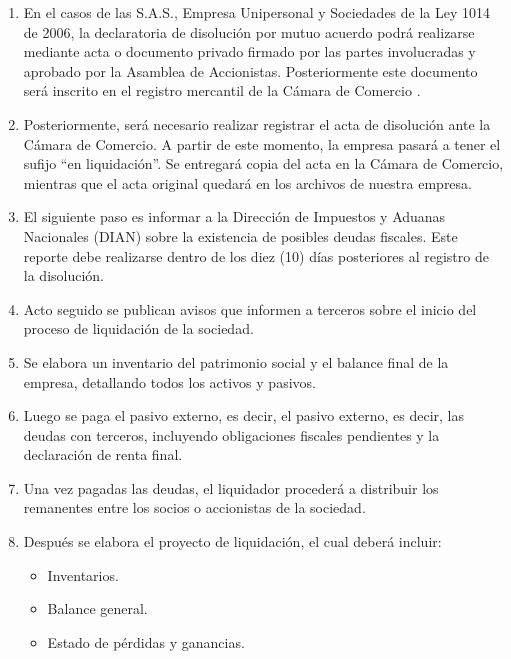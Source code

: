 \begin{enumerate}
	\item En el casos de las S.A.S., Empresa Unipersonal y Sociedades de la Ley 1014 de 2006, la declaratoria de disolución por mutuo acuerdo podrá realizarse mediante acta o documento privado firmado por las partes involucradas y aprobado por la Asamblea de Accionistas. Posteriormente este documento será inscrito en el registro mercantil de la Cámara de Comercio \parencite{Ley1014}.
	
	\item Posteriormente, será necesario realizar registrar el acta de disolución ante la Cámara de Comercio. A partir de este momento, la empresa pasará a tener el sufijo ``en liquidación''. Se entregará copia del acta en la Cámara de Comercio, mientras que el acta original quedará en los archivos de nuestra empresa.
	
	\item El siguiente paso es informar a la Dirección de Impuestos y Aduanas Nacionales (DIAN) sobre la existencia de posibles deudas fiscales. Este reporte debe realizarse dentro de los diez (10) días posteriores al registro de la disolución.
	
	\item Acto seguido se publican avisos que informen a terceros sobre el inicio del proceso de liquidación de la sociedad.
	
	\item Se elabora un inventario del patrimonio social y el balance final de la empresa, detallando todos los activos y pasivos.
	
	\item Luego se paga el pasivo externo, es decir, el pasivo externo, es decir, las deudas con terceros, incluyendo obligaciones fiscales pendientes y la declaración de renta final.
	
	\item Una vez pagadas las deudas, el liquidador procederá a distribuir los remanentes entre los socios o accionistas de la sociedad.
	
	\item Después se elabora el proyecto de liquidación, el cual deberá incluir:
	
	\begin{itemize}
		\item Inventarios.
		
		\item Balance general.
		
		\item Estado de pérdidas y ganancias.
		

\end{itemize}
\end{enumerate}
